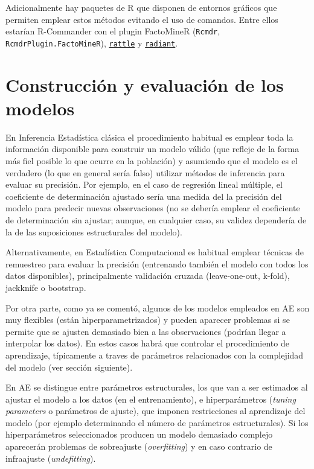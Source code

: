 \documentclass[
  spanish,
]{book}
\theoremstyle{break}
\theoremstyle{definition}
\theoremstyle{definition}
\theoremstyle{definition}
\theoremstyle{definition}
\theoremstyle{remark}
\begin{document}
Adicionalmente hay paquetes de R que disponen de entornos gráficos que permiten emplear estos métodos evitando el uso de comandos.
Entre ellos estarían R-Commander con el plugin FactoMineR (\texttt{Rcmdr}, \texttt{RcmdrPlugin.FactoMineR}), \href{https://rattle.togaware.com}{\texttt{rattle}} y \href{https://github.com/radiant-rstats/radiant}{\texttt{radiant}}.

\hypertarget{const-eval}{%
\section{Construcción y evaluación de los modelos}\label{const-eval}}

En Inferencia Estadística clásica el procedimiento habitual es emplear toda la información disponible para construir un modelo válido (que refleje de la forma más fiel posible lo que ocurre en la población) y asumiendo que el modelo es el verdadero (lo que en general sería falso) utilizar métodos de inferencia para evaluar su precisión.
Por ejemplo, en el caso de regresión lineal múltiple, el coeficiente de determinación ajustado sería una medida del la precisión del modelo para predecir nuevas observaciones (no se debería emplear el coeficiente de determinación sin ajustar; aunque, en cualquier caso, su validez dependería de la de las suposiciones estructurales del modelo).

Alternativamente, en Estadística Computacional es habitual emplear técnicas de remuestreo para evaluar la precisión (entrenando también el modelo con todos los datos disponibles), principalmente validación cruzada (leave-one-out, k-fold), jackknife o bootstrap.

Por otra parte, como ya se comentó, algunos de los modelos empleados en AE son muy flexibles (están hiperparametrizados) y pueden aparecer problemas si se permite que se ajusten demasiado bien a las observaciones (podrían llegar a interpolar los datos).
En estos casos habrá que controlar el procedimiento de aprendizaje, típicamente a traves de parámetros relacionados con la complejidad del modelo (ver sección siguiente).

En AE se distingue entre parámetros estructurales, los que van a ser estimados al ajustar el modelo a los datos (en el entrenamiento), e hiperparámetros (\emph{tuning parameters} o parámetros de ajuste), que imponen restricciones al aprendizaje del modelo (por ejemplo determinando el número de parámetros estructurales).
Si los hiperparámetros seleccionados producen un modelo demasiado complejo aparecerán problemas de sobreajuste (\emph{overfitting}) y en caso contrario de infraajuste (\emph{undefitting}).
\end{document}
